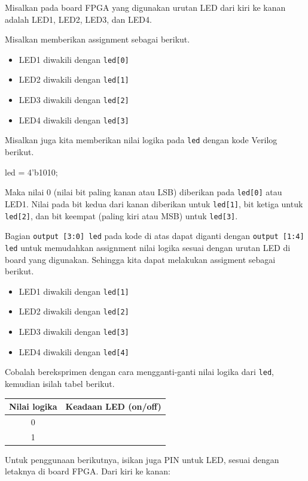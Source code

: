 Misalkan pada board FPGA yang digunakan urutan LED dari kiri ke kanan adalah LED1,
LED2, LED3, dan LED4.

Misalkan memberikan assignment sebagai berikut.
\begin{itemize}
\item LED1 diwakili dengan {\tt led[0]}
\item LED2 diwakili dengan {\tt led[1]}
\item LED3 diwakili dengan {\tt led[2]}
\item LED4 diwakili dengan {\tt led[3]}
\end{itemize}


Misalkan juga kita memberikan nilai logika pada {\tt led} dengan
kode Verilog berikut.
\begin{verilogcode}
  led = 4'b1010;
\end{verilogcode}
Maka nilai 0 (nilai bit paling kanan atau LSB) diberikan pada {\tt led[0]}
atau LED1. Nilai pada bit kedua dari kanan diberikan untuk {\tt led[1]}, bit ketiga
untuk {\tt led[2]}, dan bit keempat (paling kiri atau MSB) untuk {\tt led[3]}.

Bagian {\tt output [3:0] led} pada kode di atas dapat diganti
dengan {\tt output [1:4] led} untuk memudahkan assignment nilai logika
sesuai dengan urutan LED di board yang digunakan. Sehingga kita dapat
melakukan assigment sebagai berikut.
\begin{itemize}
\item LED1 diwakili dengan {\tt led[1]}
\item LED2 diwakili dengan {\tt led[2]}
\item LED3 diwakili dengan {\tt led[3]}
\item LED4 diwakili dengan {\tt led[4]}
\end{itemize}


Cobalah bereksprimen dengan cara mengganti-ganti nilai logika
dari {\tt led}, kemudian isilah tabel berikut.

\begin{table}[H]
\centering
\begin{tabular}{|c|c|}
\hline
Nilai logika & Keadaan LED (on/off) \\
\hline
0 & \\
1 & \\
\hline
\end{tabular}
\par
\end{table}

Untuk penggunaan berikutnya, isikan juga PIN untuk LED, sesuai dengan
letaknya di board FPGA. Dari kiri ke kanan:


